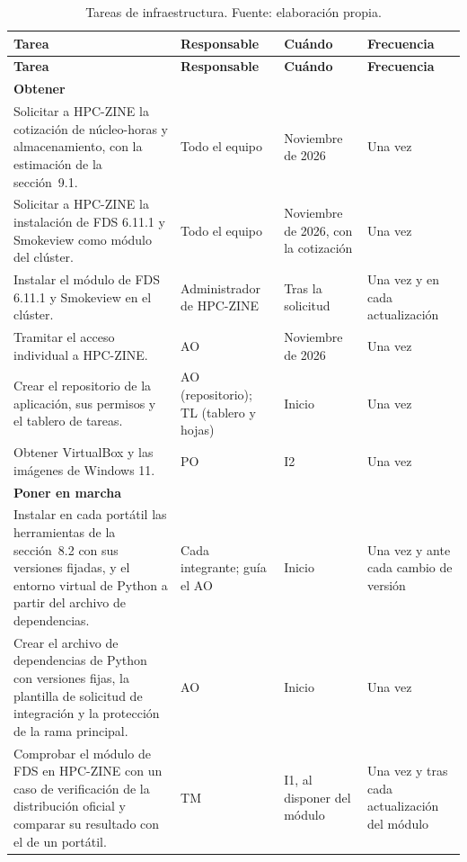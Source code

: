 \begin{longtable}{|p{}|p{}|p{}|p{}|}
\caption{Tareas de infraestructura. Fuente: elaboración propia.}\label{tab:infraestructura}\\
\hline
\textbf{Tarea} & \textbf{Responsable} & \textbf{Cuándo} & \textbf{Frecuencia}\tabularnewline\hline
\endfirsthead
\hline
\textbf{Tarea} & \textbf{Responsable} & \textbf{Cuándo} & \textbf{Frecuencia}\tabularnewline\hline
\endhead
\multicolumn{4}{|l|}{\textbf{Obtener}}\tabularnewline\hline
\raggedright Solicitar a HPC-ZINE la cotización de núcleo-horas y almacenamiento, con la estimación de la sección~9.1. & \raggedright Todo el equipo & \raggedright Noviembre de 2026 & \raggedright Una vez\tabularnewline\hline
\raggedright Solicitar a HPC-ZINE la instalación de FDS 6.11.1 y Smokeview como módulo del clúster. & \raggedright Todo el equipo & \raggedright Noviembre de 2026, con la cotización & \raggedright Una vez\tabularnewline\hline
\raggedright Instalar el módulo de FDS 6.11.1 y Smokeview en el clúster. & \raggedright Administrador de HPC-ZINE & \raggedright Tras la solicitud & \raggedright Una vez y en cada actualización\tabularnewline\hline
\raggedright Tramitar el acceso individual a HPC-ZINE. & \raggedright AO & \raggedright Noviembre de 2026 & \raggedright Una vez\tabularnewline\hline
\raggedright Crear el repositorio de la aplicación, sus permisos y el tablero de tareas. & \raggedright AO (repositorio); TL (tablero y hojas) & \raggedright Inicio & \raggedright Una vez\tabularnewline\hline
\raggedright Obtener VirtualBox y las imágenes de Windows 11. & \raggedright PO & \raggedright I2 & \raggedright Una vez\tabularnewline\hline
\multicolumn{4}{|l|}{\textbf{Poner en marcha}}\tabularnewline\hline
\raggedright Instalar en cada portátil las herramientas de la sección~8.2 con sus versiones fijadas, y el entorno virtual de Python a partir del archivo de dependencias. & \raggedright Cada integrante; guía el AO & \raggedright Inicio & \raggedright Una vez y ante cada cambio de versión\tabularnewline\hline
\raggedright Crear el archivo de dependencias de Python con versiones fijas, la plantilla de solicitud de integración y la protección de la rama principal. & \raggedright AO & \raggedright Inicio & \raggedright Una vez\tabularnewline\hline
\raggedright Comprobar el módulo de FDS en HPC-ZINE con un caso de verificación de la distribución oficial y comparar su resultado con el de un portátil. & \raggedright TM & \raggedright I1, al disponer del módulo & \raggedright Una vez y tras cada actualización del módulo\tabularnewline\hline

\end{longtable}
